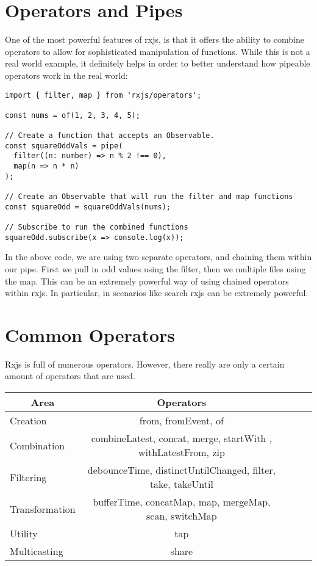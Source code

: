 \section{ Operators and Pipes }
One of the most powerful features of rxjs, is that it offers the ability to 
combine operators to allow for sophisticated manipulation of functions. While 
this is not a real world example, it definitely helps in order to better 
understand how pipeable operators work in the real world: 
\begin{lstlisting}
import { filter, map } from 'rxjs/operators';

const nums = of(1, 2, 3, 4, 5);
  
// Create a function that accepts an Observable.
const squareOddVals = pipe(
  filter((n: number) => n % 2 !== 0),
  map(n => n * n)
);  

// Create an Observable that will run the filter and map functions
const squareOdd = squareOddVals(nums);
 
// Subscribe to run the combined functions
squareOdd.subscribe(x => console.log(x));
\end{lstlisting}

In the above code, we are using two separate operators, and chaining them 
within our pipe. First we pull in odd values using the filter, then we 
multiple files using the map. This can be an extremely powerful way of 
using chained operators within rxjs. In particular, in scenarios like search
rxjs can be extremely powerful. 

\section{ Common Operators }
Rxjs is full of numerous operators. However, there really are only a certain
amount of operators that are used. 
\begin{center}
  \begin{tabular}{@{} l *4c @{}}
    \toprule
    \multicolumn{1}{c}{\color{red}Area} & Operators \\
    \midrule
    Creation       & from, fromEvent, of \\
    Combination    & combineLatest, concat, merge, startWith , withLatestFrom, zip \\
    Filtering      & debounceTime, distinctUntilChanged, filter, take, takeUntil \\
    Transformation & bufferTime, concatMap, map, mergeMap, scan, switchMap \\
    Utility        & tap \\
    Multicasting   & share \\
  \end{tabular}
\end{center}  

